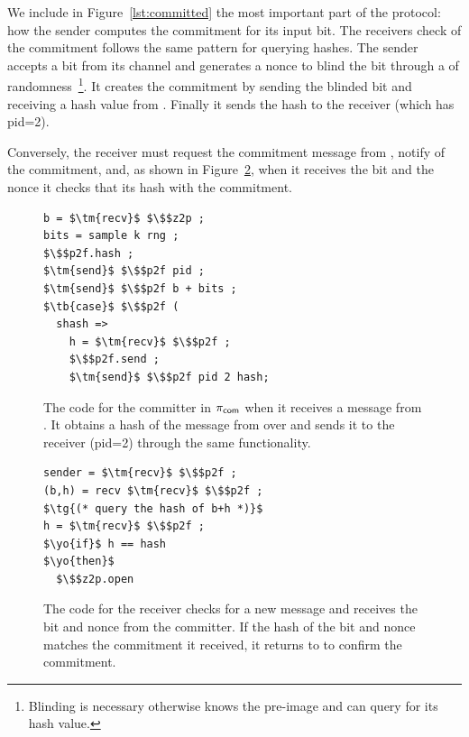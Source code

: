 We include in Figure~\ref{lst:committed} the most important part of the protocol: how the sender computes the commitment for its input bit. The receivers check of the commitment follows the same pattern for querying hashes. 
The sender accepts a bit from its  channel and generates a nonce to blind the bit through a  of randomness~\footnote{Blinding is necessary otherwise \A knows the pre-image and can query \Fro for its hash value.}.
It creates the commitment by sending \Fropp the blinded bit and receiving a hash value from .
Finally it sends the hash to the receiver (which has pid=2).

Conversely, the receiver must request the commitment  message from \Fropp, notify \Z of the commitment, and, as shown in Figure~\ref{lst:receiver}, when it receives the bit and the nonce it checks that its hash with the commitment.
\begin{figure}
\begin{lstlisting}[basicstyle=\footnotesize\BeraMonottFamily, frame=single, mathescape]
b = $\tm{recv}$ $\$$z2p ;
bits = sample k rng ;
$\$$p2f.hash ;
$\tm{send}$ $\$$p2f pid ;
$\tm{send}$ $\$$p2f b + bits ;
$\tb{case}$ $\$$p2f (
  shash => 
    h = $\tm{recv}$ $\$$p2f ;
    $\$$p2f.send ;
    $\tm{send}$ $\$$p2f pid 2 hash;
\end{lstlisting}
\caption{The code for the committer in $\pi_{{\mathsf {com}}}$ when it receives a  message from \Z. It obtains a hash of the message from \Fropp over  and sends it to the receiver (pid=2) through the same functionality.}
\label{lst:committer}
\end{figure}
\begin{figure}
\begin{lstlisting}[basicstyle=\footnotesize\BeraMonottFamily, frame=single, mathescape]
sender = $\tm{recv}$ $\$$p2f ;
(b,h) = recv $\tm{recv}$ $\$$p2f ;
$\tg{(* query the hash of b+h *)}$
h = $\tm{recv}$ $\$$p2f ;
$\yo{if}$ h == hash
$\yo{then}$
  $\$$z2p.open
\end{lstlisting}
\caption{The code for the receiver checks for a new message and receives the bit and nonce from the committer. If the hash of the bit and nonce matches the commitment it received, it returns  to \Z to confirm the commitment.}
\label{lst:receiver}
\end{figure}

